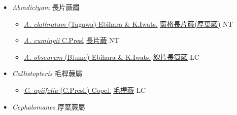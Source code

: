 
  \begin{itemize}
 \item[] \textit{Abrodictyum} 長片蕨屬
                    
  \begin{itemize}
        \item[] \href{http://www.theplantlist.org/tpl1.1/search?q=Abrodictyum+clathratum}{\textit{A. clathratum} (Tagawa) Ebihara \& K.Iwats.}     \href{\detokenize{http://taibnet.sinica.edu.tw/chi/taibnet_species_list.php?T2=窗格長片蕨&T2_new_value=true&fr=y}}{窗格長片蕨(厚葉蕨)}   NT
        \item[] \href{http://www.theplantlist.org/tpl1.1/search?q=Abrodictyum+cumingii}{\textit{A. cumingii} C.Presl}   \href{\detokenize{http://taibnet.sinica.edu.tw/chi/taibnet_species_list.php?T2=長片蕨&T2_new_value=true&fr=y}}{長片蕨} NT
        \item[] \href{http://www.theplantlist.org/tpl1.1/search?q=Abrodictyum+obscurum}{\textit{A. obscurum} (Blume) Ebihara \& K.Iwats.}     \href{\detokenize{http://taibnet.sinica.edu.tw/chi/taibnet_species_list.php?T2=線片長筒蕨&T2_new_value=true&fr=y}}{線片長筒蕨} LC
  \end{itemize}
 \item[] \textit{Callistopteris} 毛桿蕨屬
                    
  \begin{itemize}
        \item[] \href{http://www.theplantlist.org/tpl1.1/search?q=Callistopteris+apiifolia}{\textit{C. apiifolia} (C.Presl.) Copel.}   \href{\detokenize{http://taibnet.sinica.edu.tw/chi/taibnet_species_list.php?T2=毛桿蕨&T2_new_value=true&fr=y}}{毛桿蕨} LC
  \end{itemize}
 \item[] \textit{Cephalomanes} 厚葉蕨屬
                    

\end{itemize}
